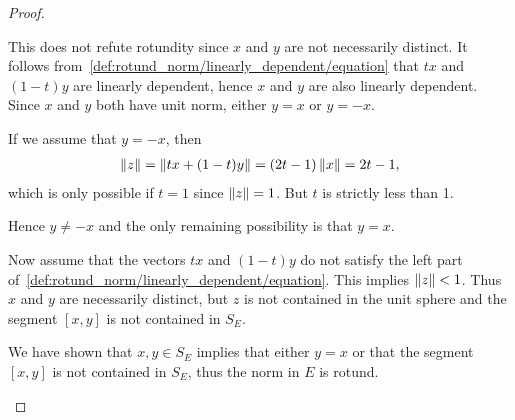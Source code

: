 \begin{proof}
\begin{description}
    This does not refute rotundity since \( x \) and \( y \) are not necessarily distinct. It follows from~\cref{def:rotund_norm/linearly_dependent/equation} that \( tx \) and \( (1-t)y \) are linearly dependent, hence \( x \) and \( y \) are also linearly dependent. Since \( x \) and \( y \) both have unit norm, either \( y = x \) or \( y = -x \).

    If we assume that \( y = -x \), then
    \begin{align*}
      \left\Vert z \right\Vert
      =
      \left\Vert tx + (1-t)y \right\Vert
      =
      (2t - 1) \left\Vert x \right\Vert
      =
      2t - 1,
    \end{align*}
    which is only possible if \( t = 1 \) since \( \left\Vert z \right\Vert = 1 \). But \( t \) is strictly less than 1.

    Hence \( y \neq -x \) and the only remaining possibility is that \( y = x \).

    Now assume that the vectors \( tx \) and \( (1-t)y \) do not satisfy the left part of~\cref{def:rotund_norm/linearly_dependent/equation}. This implies \( \left\Vert z \right\Vert < 1 \). Thus \( x \) and \( y \) are necessarily distinct, but \( z \) is not contained in the unit sphere and the segment \( [x, y] \) is not contained in \( S_E \).

    We have shown that \( x, y \in S_E \) implies that either \( y = x \) or that the segment \( [x, y] \) is not contained in \( S_E \), thus the norm in \( E \) is rotund.
  \end{description}
\end{proof}

